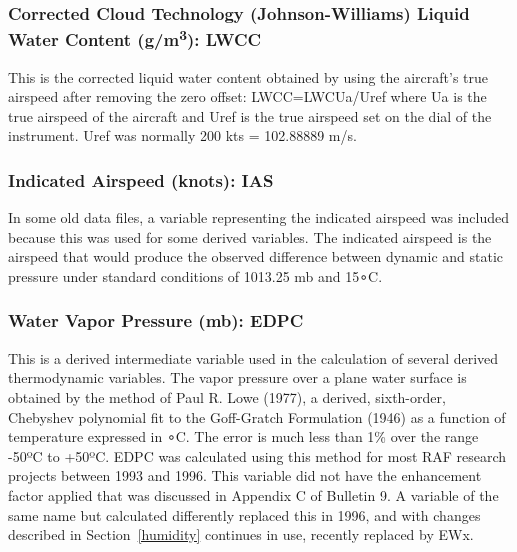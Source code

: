 \documentclass[
]{book}
\begin{document}
\hypertarget{jwlw-corrected}{%
\subsubsection*{\texorpdfstring{Corrected Cloud Technology (Johnson-Williams) Liquid Water Content (g/m\textsuperscript{3}): LWCC}{Corrected Cloud Technology (Johnson-Williams) Liquid Water Content (g/m3): LWCC}}\label{jwlw-corrected}}

This is the corrected liquid water content obtained by using the aircraft's true airspeed after removing the zero offset: LWCC=LWC{Ua/Uref} where {Ua} is the true airspeed of the aircraft and {Uref} is the true airspeed set on the dial of the instrument. {Uref} was normally 200 kts = 102.88889 m/s.

\hypertarget{ias}{%
\subsubsection*{Indicated Airspeed (knots): IAS}\label{ias}}

In some old data files, a variable representing the indicated airspeed was included because this was used for some derived variables. The indicated airspeed is the airspeed that would produce the observed difference between dynamic and static pressure under standard conditions of 1013.25 mb and {15∘}C.

\hypertarget{edpc}{%
\subsubsection*{Water Vapor Pressure (mb): EDPC}\label{edpc}}

This is a derived intermediate variable used in the calculation of several derived thermodynamic variables. The vapor pressure over a plane water surface is obtained by the method of Paul R. Lowe (1977), a derived, sixth-order, Chebyshev polynomial fit to the Goff-Gratch Formulation (1946) as a function of temperature expressed in {∘C}. The error is much less than 1\% over the range -50{º}C to +50{º}C. EDPC was calculated using this method for most RAF research projects between 1993 and 1996. This variable did not have the enhancement factor applied that was discussed in Appendix C of Bulletin 9. A variable of the same name but calculated differently replaced this in 1996, and with changes described in Section~\ref{humidity} continues in use, recently replaced by EWx.
\end{document}
